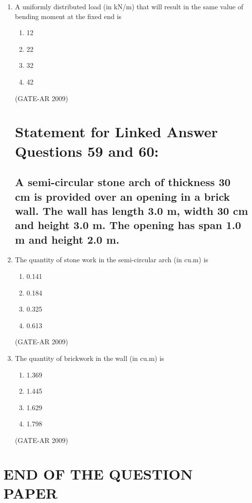 \documentclass[a4paper,10pt]{article}
\begin{document}
\begin{enumerate}
    \item A uniformly distributed load (in kN/m) that will result in the same value of bending moment at the fixed end is 
    \begin{multicols}{4}
	\begin{enumerate}
        \item 12
        \item 22
        \item 32
        \item 42
    \end{enumerate}
	\end{multicols}
    \hfill (GATE-AR 2009)

\section*{Statement for Linked Answer Questions 59 and 60:}
\subsection*{A semi-circular stone arch of thickness 30 cm is provided over an opening in a brick wall. The wall has length 3.0 m, width 30 cm and height 3.0 m. The opening has span 1.0 m and height 2.0 m.}

    \item The quantity of stone work in the semi-circular arch (in cu.m) is 
    \begin{multicols}{4}
	\begin{enumerate}
        \item 0.141
        \item 0.184
        \item 0.325
        \item 0.613
    \end{enumerate}
	\end{multicols}
    \hfill (GATE-AR 2009)

    \item The quantity of brickwork in the wall (in cu.m) is 
    \begin{multicols}{4}
	\begin{enumerate}
        \item 1.369
        \item 1.445
        \item 1.629
        \item 1.798
    \end{enumerate}
	\end{multicols}
    \hfill (GATE-AR 2009)
    
\end{enumerate}

\centering
\section*{END OF THE QUESTION PAPER}
\end{document}
